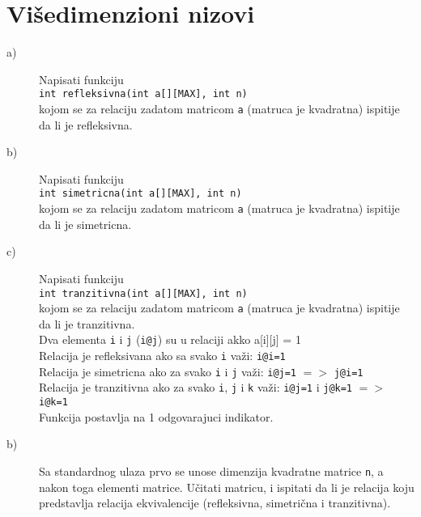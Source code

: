 \section{Višedimenzioni nizovi}

\begin{Exercise}[label=p1.2_] 
\begin{description}
  \item[a)] Napisati funkciju
    \\ \verb|int refleksivna(int a[][MAX], int n)|\\ kojom se za
    relaciju zadatom matricom \verb|a| (matruca je kvadratna) ispitije
    da li je refleksivna.
  \item[b)] Napisati funkciju
    \\ \verb|int simetricna(int a[][MAX], int n)|\\ kojom se za
    relaciju zadatom matricom \verb|a| (matruca je kvadratna) ispitije
    da li je simetricna.
  \item[c)] Napisati funkciju
    \\ \verb|int tranzitivna(int a[][MAX], int n)|\\ kojom se za
    relaciju zadatom matricom \verb|a| (matruca je kvadratna) ispitije
    da li je tranzitivna. \\
 
    Dva elementa \verb|i| i \verb|j| (\verb|i@j|) su u relaciji akko
    a[i][j] = 1\\ Relacija je refleksivana ako sa svako \verb|i| va\v
    zi: \verb|i@i=1|\\ Relacija je simetricna ako za svako \verb|i| i
    \verb|j| va\v zi: \verb|i@j=1| $=>$ \verb|j@i=1|\\ Relacija je
    tranzitivna ako za svako \verb|i|, \verb|j| i \verb|k| va\v zi:
    \verb|i@j=1| i \verb|j@k=1| $=>$ \verb|i@k=1|\\ Funkcija postavlja
    na 1 odgovarajuci indikator.

  \item[b)] Sa standardnog ulaza prvo se unose dimenzija kvadratne
    matrice \verb|n|, a nakon toga elementi matrice.  U\v citati
    matricu, i ispitati da li je relacija koju predstavlja relacija
    ekvivalencije (refleksivna, simetri\v cna i tranzitivna).
\end{description}
\end{Exercise}
\begin{Answer}[ref=p1.2_]
\end{Answer}

